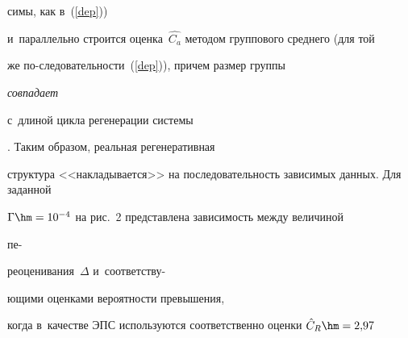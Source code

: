 




\noindent


симы, как в~(\ref{dep})) 


и~параллельно строится оценка~$\hat{C_a}$ методом  группового среднего (для той 


же  по-\linebreak следовательности~(\ref{dep})), причем  размер группы  {\it совпадает 


с~длиной цикла регенерации системы}. Таким образом, реальная регенеративная 


структура <<накладывается>> на последовательность зависимых данных. Для заданной\linebreak 


$\Gamma\hm=10^{-4}$ на рис.~2   представлена зависимость между величиной 


пе-\linebreak


реоценивания~$\Delta$ и~со\-от\-вет\-ст\-ву-\hspace*{74.5mm}\linebreak


ющи\-ми  оценками  вероятности превышения, 


когда в~качестве   ЭПС используются соответственно оценки $\hat{C}_R \hm= 2{,}97$ 


